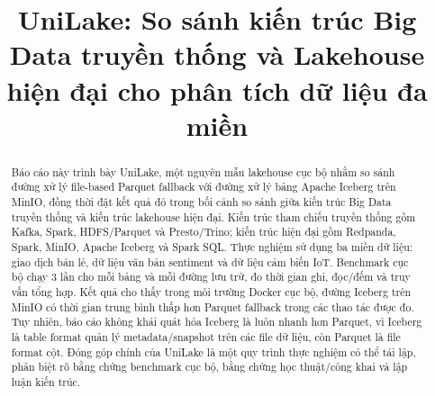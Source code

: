 \documentclass[conference]{IEEEtran}
\begin{document}
\title{UniLake: So sánh kiến trúc Big Data truyền thống và Lakehouse hiện đại cho phân tích dữ liệu đa miền}

\author{
\and
{}
\and
{}
\and
{}
\and
{}
}

\maketitle

\begin{abstract}
Báo cáo này trình bày UniLake, một nguyên mẫu lakehouse cục bộ nhằm so sánh đường xử lý file-based Parquet fallback với đường xử lý bảng Apache Iceberg trên MinIO, đồng thời đặt kết quả đó trong bối cảnh so sánh giữa kiến trúc Big Data truyền thống và kiến trúc lakehouse hiện đại. Kiến trúc tham chiếu truyền thống gồm Kafka, Spark, HDFS/Parquet và Presto/Trino; kiến trúc hiện đại gồm Redpanda, Spark, MinIO, Apache Iceberg và Spark SQL. Thực nghiệm sử dụng ba miền dữ liệu: giao dịch bán lẻ, dữ liệu văn bản sentiment và dữ liệu cảm biến IoT. Benchmark cục bộ chạy 3 lần cho mỗi bảng và mỗi đường lưu trữ, đo thời gian ghi, đọc/đếm và truy vấn tổng hợp. Kết quả cho thấy trong môi trường Docker cục bộ, đường Iceberg trên MinIO có thời gian trung bình thấp hơn Parquet fallback trong các thao tác được đo. Tuy nhiên, báo cáo không khái quát hóa Iceberg là luôn nhanh hơn Parquet, vì Iceberg là table format quản lý metadata/snapshot trên các file dữ liệu, còn Parquet là file format cột. Đóng góp chính của UniLake là một quy trình thực nghiệm có thể tái lập, phân biệt rõ bằng chứng benchmark cục bộ, bằng chứng học thuật/công khai và lập luận kiến trúc.
\end{abstract}
\end{document}
